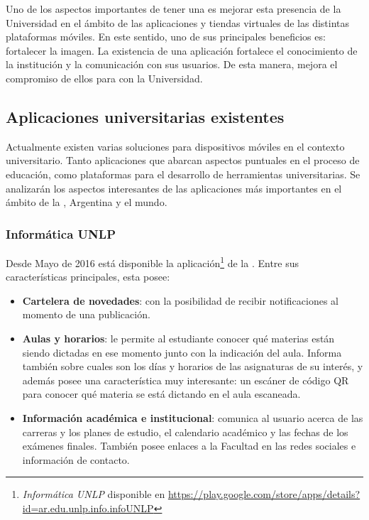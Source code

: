 Uno de los aspectos importantes de tener una  es mejorar esta presencia de la Universidad  en el ámbito de las aplicaciones y tiendas virtuales de las distintas plataformas móviles. En este sentido, uno de sus principales beneficios es: fortalecer la imagen. La existencia de una aplicación fortalece el conocimiento de la institución y la comunicación con sus usuarios. De esta manera, mejora el compromiso de ellos para con la Universidad\cite{presenciaMovil}.

\subsection{Aplicaciones universitarias existentes}
\label{aplicaciones_universitarias_existentes}

Actualmente existen varias soluciones para dispositivos móviles en el contexto
universitario. Tanto aplicaciones que abarcan aspectos puntuales en el proceso
de educación, como plataformas para el desarrollo de herramientas
universitarias. Se analizarán los aspectos interesantes de las aplicaciones más
importantes en el ámbito de la \unlp, Argentina y el mundo.


\subsubsection{Informática UNLP}
\label{aplicaciones_existentes_unlp_informatica}


Desde Mayo de 2016 está disponible la aplicación\footnote{ \textit{Informática UNLP} disponible en \url{https://play.google.com/store/apps/details?id=ar.edu.unlp.info.infoUNLP} } de la \facultad. Entre sus características principales, esta posee:
\begin{itemize}
\item \textbf{Cartelera de novedades}: con la posibilidad de recibir notificaciones al momento de una publicación.
\item \textbf{Aulas y horarios}: le permite al estudiante conocer qué materias están siendo dictadas en ese momento junto con la indicación del aula. Informa también sobre cuales son los días y horarios de las asignaturas de su interés, y además posee una característica muy interesante: un escáner de código QR para conocer qué materia se está dictando en el aula escaneada.
\item \textbf{Información académica e institucional}: comunica al usuario acerca de las carreras y los planes de estudio, el calendario académico y las fechas de los exámenes finales. También posee enlaces a la Facultad en las redes sociales e información de contacto.
\end{itemize}


